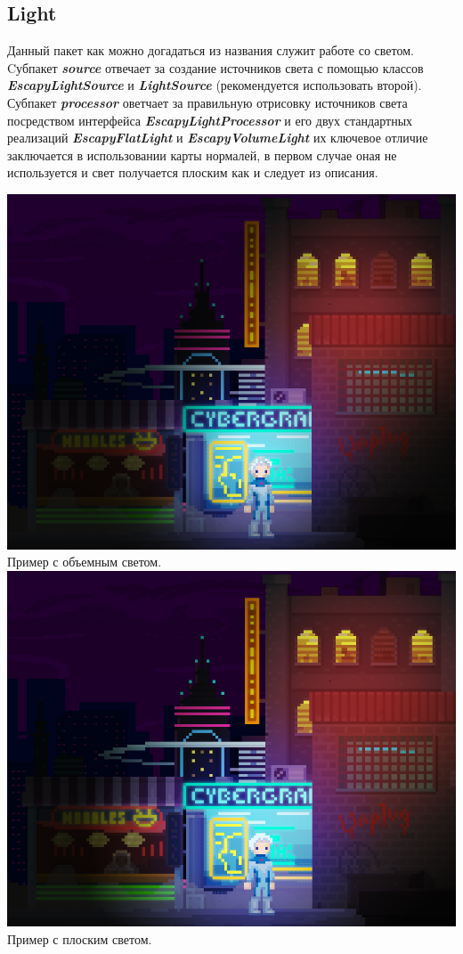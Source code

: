 \documentclass[11pt]{report}
\begin{document}
\subsection{Light}
Данный пакет как можно догадаться из названия служит работе со светом. 
\\Cубпакет \textit{\textbf{source}} отвечает за создание источников света с помощью классов  \textit{\textbf{EscapyLightSource}} и \textit{\textbf{LightSource}} (рекомендуется использовать второй). Субпакет \textit{\textbf{processor}} оветчает за правильную отрисовку источников света посредством интерфейса \textit{\textbf{EscapyLightProcessor}} и его двух стандартных реализаций \textit{\textbf{EscapyFlatLight}} и \textit{\textbf{EscapyVolumeLight}} их ключевое отличие заключается в использовании карты нормалей, в первом случае оная не используется и свет получается плоским как и следует из описания.
\begin{center}
	\includegraphics[width=1\linewidth]{img/10.png}
	Пример с объемным светом.
	\includegraphics[width=1\linewidth]{img/11.png}  
	Пример с плоским светом.
  	\label{img:1011} 
\end{center}
\end{document}
